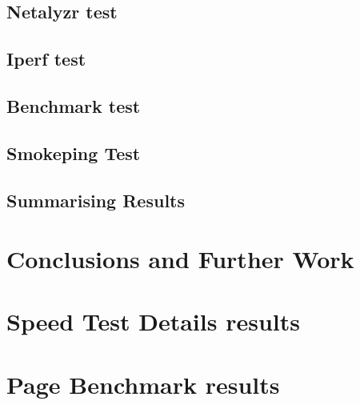 \documentclass[letter, 11pt]{article}
\theoremstyle{plain}
\theoremstyle{definition}
\begin{document}
\subsection{Netalyzr test}


\subsection{Iperf test}


\subsection{Benchmark test}


\subsection{Smokeping Test}


\subsection{Summarising Results}

\newpage
\section{Conclusions and Further Work}

\newpage
{}
\newpage
\begin{appendix}
\section{Speed Test Details results}\label{app:bwmeasures}

\newpage
\section{Page Benchmark results}\label{app:pbmeasures}

\end{appendix}
\end{document}
